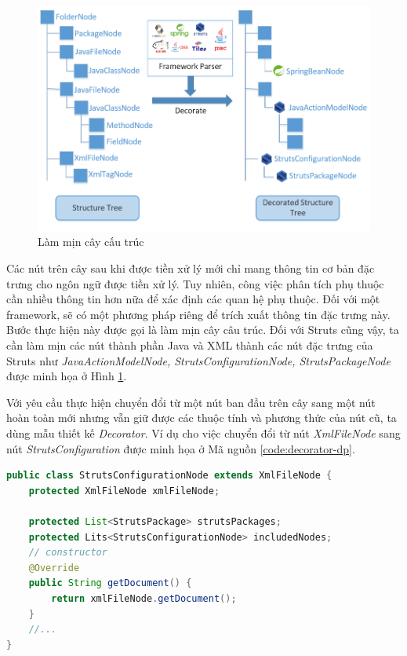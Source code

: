 \documentclass[12pt]{report}
\begin{document}
\begin{figure}[h]
	\centering
	\includegraphics[scale=0.6]{lam-min}
	\caption{Làm mịn cây cấu trúc}
	\label{fig:lam-min}
\end{figure}

Các nút trên cây sau khi được tiền xử lý mới chỉ mang thông tin cơ bản đặc trưng cho ngôn ngữ được tiền xử lý. Tuy nhiên, công việc phân tích phụ thuộc cần nhiều thông tin hơn nữa để xác định các quan hệ phụ thuộc. Đối với một framework, sẽ có một phương pháp riêng để trích xuất thông tin đặc trưng này. Bước thực hiện này được gọi là làm mịn cây câu trúc. Đối với Struts cũng vậy, ta cần làm mịn các nút thành phần Java và XML thành các nút đặc trưng của Struts như \textit{JavaActionModelNode, StrutsConfigurationNode, StrutsPackageNode} được minh họa ở Hình \ref{fig:lam-min}.

Với yêu cầu thực hiện chuyển đổi từ một nút ban đầu trên cây sang một nút hoàn toàn mới nhưng vẫn giữ được các thuộc tính và phương thức của nút cũ, ta dùng mẫu thiết kế \textit{Decorator}. Ví dụ cho việc chuyển đổi từ nút \textit{XmlFileNode} sang nút \textit{StrutsConfiguration} được minh họa ở Mã nguồn \ref{code:decorator-dp}.

\begin{lstlisting}[language=Java,
caption={Ví dụ sử dụng mẫu thiết kế Decorator},label={code:decorator-dp}]
public class StrutsConfigurationNode extends XmlFileNode {
	protected XmlFileNode xmlFileNode;
	
	protected List<StrutsPackage> strutsPackages;
	protected Lits<StrutsConfigurationNode> includedNodes;
	// constructor
	@Override
	public String getDocument() {
		return xmlFileNode.getDocument();
	}
	//...
}
\end{lstlisting}
\end{document}
